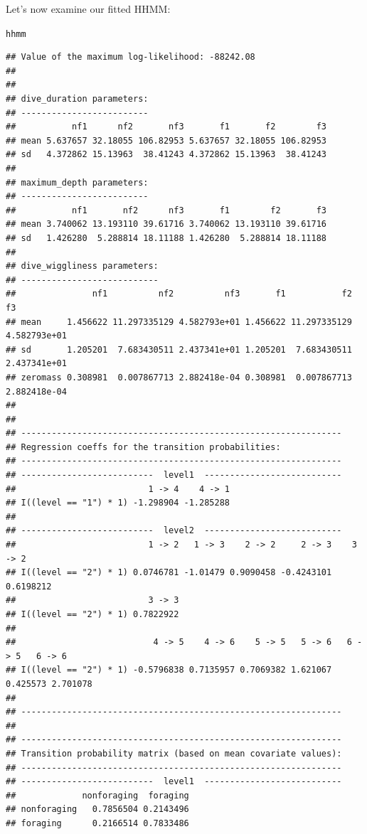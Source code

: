\documentclass[12pt]{article}\usepackage[]{graphicx}\usepackage[]{xcolor}
\makeatletter
\newcommand{\hldef}[1]{\textcolor[rgb]{0.345,0.345,0.345}{#1}}%
\newenvironment{kframe}{%
 \def\at@end@of@kframe{}%
 \ifinner\ifhmode%
  \def\at@end@of@kframe{\end{minipage}}%
  \begin{minipage}{\columnwidth}%
 \fi\fi%
 \def\FrameCommand##1{\hskip\@totalleftmargin \hskip-\fboxsep
 \colorbox{shadecolor}{##1}\hskip-\fboxsep
     \hskip-\linewidth \hskip-\@totalleftmargin \hskip\columnwidth}%
 \MakeFramed {\advance\hsize-\width
   \@totalleftmargin\z@ \linewidth\hsize
   \@setminipage}}%
 {\par\unskip\endMakeFramed%
 \at@end@of@kframe}
\newenvironment{knitrout}{}{} %
\makeatother
\begin{document}
Let's now examine our fitted HHMM:
\begin{knitrout}
\color{fgcolor}\begin{kframe}
\begin{alltt}
\hldef{hhmm}
\end{alltt}
\begin{verbatim}
## Value of the maximum log-likelihood: -88242.08 
## 
## 
## dive_duration parameters:
## -------------------------
##           nf1      nf2       nf3       f1       f2        f3
## mean 5.637657 32.18055 106.82953 5.637657 32.18055 106.82953
## sd   4.372862 15.13963  38.41243 4.372862 15.13963  38.41243
## 
## maximum_depth parameters:
## -------------------------
##           nf1       nf2      nf3       f1        f2       f3
## mean 3.740062 13.193110 39.61716 3.740062 13.193110 39.61716
## sd   1.426280  5.288814 18.11188 1.426280  5.288814 18.11188
## 
## dive_wiggliness parameters:
## ---------------------------
##               nf1          nf2          nf3       f1           f2           f3
## mean     1.456622 11.297335129 4.582793e+01 1.456622 11.297335129 4.582793e+01
## sd       1.205201  7.683430511 2.437341e+01 1.205201  7.683430511 2.437341e+01
## zeromass 0.308981  0.007867713 2.882418e-04 0.308981  0.007867713 2.882418e-04
## 
## 
## ---------------------------------------------------------------
## Regression coeffs for the transition probabilities:
## ---------------------------------------------------------------
## --------------------------  level1  ---------------------------
##                          1 -> 4    4 -> 1
## I((level == "1") * 1) -1.298904 -1.285288
## 
## --------------------------  level2  ---------------------------
##                          1 -> 2   1 -> 3    2 -> 2     2 -> 3    3 -> 2
## I((level == "2") * 1) 0.0746781 -1.01479 0.9090458 -0.4243101 0.6198212
##                          3 -> 3
## I((level == "2") * 1) 0.7822922
## 
##                           4 -> 5    4 -> 6    5 -> 5   5 -> 6   6 -> 5   6 -> 6
## I((level == "2") * 1) -0.5796838 0.7135957 0.7069382 1.621067 0.425573 2.701078
## 
## ---------------------------------------------------------------
## 
## ---------------------------------------------------------------
## Transition probability matrix (based on mean covariate values):
## ---------------------------------------------------------------
## --------------------------  level1  ---------------------------
##             nonforaging  foraging
## nonforaging   0.7856504 0.2143496
## foraging      0.2166514 0.7833486

\end{verbatim}
\end{kframe}
\end{knitrout}
\end{document}
